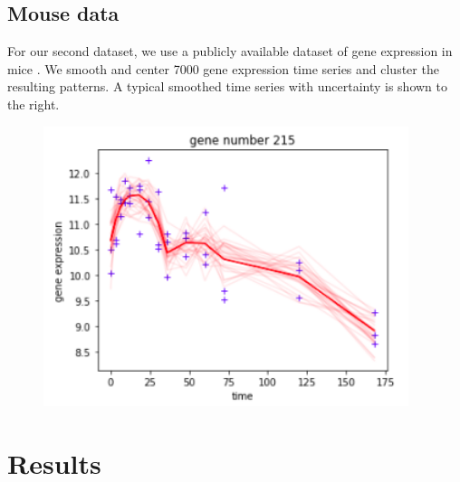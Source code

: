 \documentclass[a0,plainsections,30pt]{sciposter}\usepackage[]{graphicx}\usepackage[]{color}
\newenvironment{knitrout}{}{} %
\begin{document}
\begin{minipage}[t]{0.45\textwidth}
\begin{minipage}[t]{0.49\textwidth}
\begin{knitrout}
{}



\end{knitrout}
\end{minipage}
%

\vspace{1em}

\begin{minipage}[t]{0.49\textwidth}
%
\subsection*{Mouse data} For our second dataset, we use a publicly available
dataset of gene expression in mice \citep{shoemaker:2015:ultrasensitive}. We
smooth and center 7000 gene expression time series and cluster the resulting
patterns.  A typical smoothed time series with uncertainty is shown to the
right.
%
\end{minipage}
%
\begin{minipage}[t]{0.49\textwidth}
\begin{figure}[!h]
\centering
\includegraphics[width = 0.95\textwidth]{./static_images/mouse_genes.png}
\end{figure}
\end{minipage}
%

\vspace{-0.6in}
\section*{Results}
\vspace{-0.3in}


\end{minipage}
\end{document}
